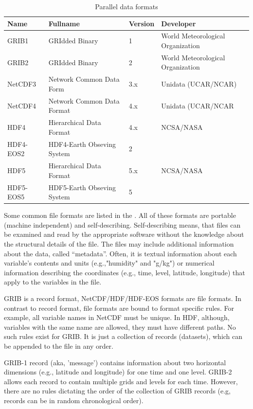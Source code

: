 \documentclass{../../template/esiwace-report}
\begin{document}
\begin{table}
  \centering
  \begin{tabular}{l|l|l|l}
    Name      & Fullname                   & Version & Developer \\
    \hline
    GRIB1     & GRIdded Binary             & 1       & World Meteorological Organization\\
    GRIB2     & GRIdded Binary             & 2       & World Meteorological Organization\\
    NetCDF3   & Network Common Data Form   & 3.x     & Unidata (UCAR/NCAR)\\
    NetCDF4   & Network Common Data Format & 4.x     & Unidata (UCAR/NCAR\\
    HDF4      & Hierarchical Data Format   & 4.x     & NCSA/NASA\\
    HDF4-EOS2 & HDF4-Earth Obseving System & 2       & \\
    HDF5      & Hierarchical Data Format   & 5.x     & NCSA/NASA\\
    HDF5-EOS5 & HDF5-Earth Obseving System & 5       & \\
\end{tabular}
\caption{Parallel data formats}
\label{tab:fformats}
\end{table}


Some common file formats are listed in the .
All of these formats are portable (machine independent) and self-describing.  
Self-describing means, that files can be examined and read by the appropriate software without the knowledge about the structural details of the file.  
The files may include additional information about the data, called ``metadata''.
Often, it is textual information about each variable's contents and units (e.g.,"humidity" and "g/kg") or numerical information describing the coordinates (e.g., time, level, latitude, longitude) that apply to the variables in the file.

GRIB is a record format, NetCDF/HDF/HDF-EOS formats are file formats.
In contrast to record format, file formats are bound to format specific rules.
For example, all variable names in NetCDF must be unique.
In HDF, although, variables with the same name are allowed, they must have different paths.
No such rules exist for GRIB.
It is just a collection of records (datasets), which can be appended to the file in any order. 

GRIB-1 record (aka, 'message') contains information about two horizontal dimensions (e.g., latitude and longitude) for one time and one level. 
GRIB-2 allows each record to contain multiple grids and levels for each time. 
However, there are no rules dictating the order of the collection of GRIB records (e.g, records can be in random chronological order).
\end{document}

